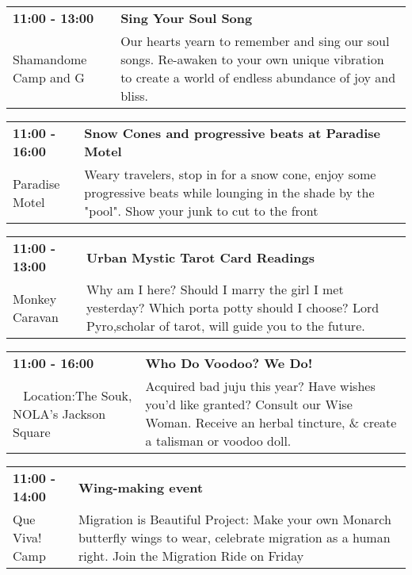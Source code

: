 \begin{tabular}{ p{1in} p{2.2in} }
    \textbf{11:00 - 13:00} & \textbf{Sing Your Soul Song} \\
    Shamandome Camp \newline 615 and G & Our hearts yearn to remember and sing our soul songs. Re-awaken to your own unique vibration to create a world of endless abundance of joy and bliss. \\
    \hline 
\end{tabular}
    
\begin{tabular}{ p{1in} p{2.2in} }
    \textbf{11:00 - 16:00} & \textbf{Snow Cones and progressive beats at Paradise Motel} \\
    Paradise Motel \newline  & Weary travelers, stop in for a snow cone, enjoy some progressive beats while lounging in the shade by the "pool".   Show your junk to cut to the front \\
    \hline 
\end{tabular}
    
\begin{tabular}{ p{1in} p{2.2in} }
    \textbf{11:00 - 13:00} & \textbf{Urban Mystic Tarot Card Readings} \\
    Monkey Caravan \newline  & Why am I here? Should I marry the girl I met yesterday? Which porta potty should I choose? Lord Pyro,scholar of tarot, will guide you to the future. \\
    \hline 
\end{tabular}
    
\begin{tabular}{ p{1in} p{2.2in} }
    \textbf{11:00 - 16:00} & \textbf{Who Do Voodoo? We Do!} \\
    ~ \newline Location:The Souk, NOLA's Jackson Square  & Acquired bad juju this year? Have wishes you'd like granted? Consult our Wise Woman. Receive an herbal tincture, \& create a talisman or voodoo doll. \\
    \hline 
\end{tabular}
    
\begin{tabular}{ p{1in} p{2.2in} }
    \textbf{11:00 - 14:00} & \textbf{Wing-making event} \\
    Que Viva! Camp \newline  & Migration is Beautiful Project: Make your own Monarch butterfly wings to wear, celebrate migration as a human right. Join the Migration Ride on Friday \\
    \hline 
\end{tabular}
    
